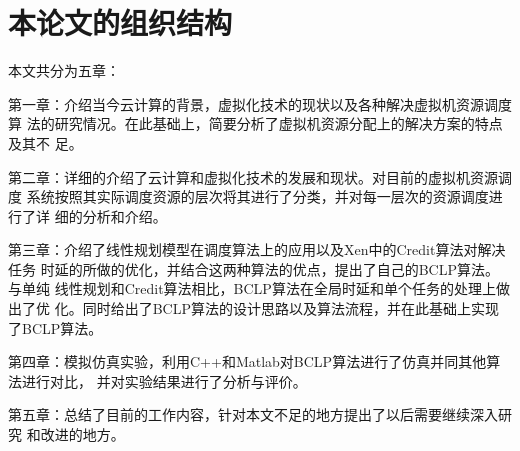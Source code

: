 \section{本论文的组织结构}
本文共分为五章：

第一章：介绍当今云计算的背景，虚拟化技术的现状以及各种解决虚拟机资源调度算
法的研究情况。在此基础上，简要分析了虚拟机资源分配上的解决方案的特点及其不
足。

第二章：详细的介绍了云计算和虚拟化技术的发展和现状。对目前的虚拟机资源调度
系统按照其实际调度资源的层次将其进行了分类，并对每一层次的资源调度进行了详
细的分析和介绍。

第三章：介绍了线性规划模型在调度算法上的应用以及Xen中的Credit算法对解决任务
时延的所做的优化，并结合这两种算法的优点，提出了自己的BCLP算法。与单纯
线性规划和Credit算法相比，BCLP算法在全局时延和单个任务的处理上做出了优
化。同时给出了BCLP算法的设计思路以及算法流程，并在此基础上实现了BCLP算法。

第四章：模拟仿真实验，利用C++和Matlab对BCLP算法进行了仿真并同其他算法进行对比，
并对实验结果进行了分析与评价。

第五章：总结了目前的工作内容，针对本文不足的地方提出了以后需要继续深入研究
和改进的地方。
